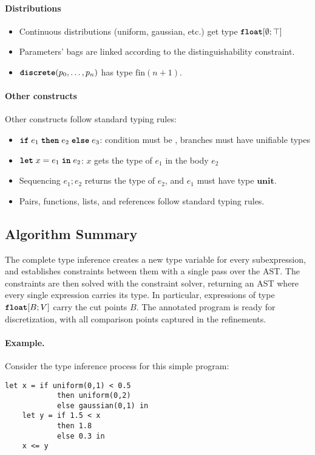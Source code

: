 \paragraph{Distributions}
\begin{itemize}
    \item Continuous distributions (uniform, gaussian, etc.) get type $\textnormal{\ttfamily\bfseries float}[\emptyset; \top]$
    \item Parameters' bags are linked according to the distinguishability constraint.
    \item $\textnormal{\ttfamily\bfseries discrete}(p_0, \ldots, p_n)$ has type $\text{fin}(n+1)$.
\end{itemize}


\paragraph{Other constructs}
Other constructs follow standard typing rules:
\begin{itemize}
    \item $\textnormal{\ttfamily\bfseries if} \; e_1\; \textnormal{\ttfamily\bfseries then} \; e_2\; \textnormal{\ttfamily\bfseries else} \; e_3$: condition must be \bool{}, branches must have unifiable types
    \item $\textnormal{\ttfamily\bfseries let} \; x = e_1 \; \textnormal{\ttfamily\bfseries in} \; e_2$: $x$ gets the type of $e_1$ in the body $e_2$
    \item Sequencing $e_1; e_2$ returns the type of $e_2$, and $e_1$ must have type $\textbf{unit}$.
    \item Pairs, functions, lists, and references follow standard typing rules.
\end{itemize}

\subsection{Algorithm Summary}

The complete type inference creates a new type variable for every subexpression, and establishes constraints between them with a single pass over the AST. The constraints are then solved with the constraint solver, returning an AST where every single expression carries its type. In particular, expressions of type $\textnormal{\ttfamily\bfseries float}[B; V]$ carry the cut points $B$. The annotated program is ready for discretization, with all comparison points captured in the refinements.

\paragraph{Example.}
Consider the type inference process for this simple program:
\begin{lstlisting}[aboveskip=1em,belowskip=1em,escapechar=!]
    let x = if uniform(0,1) < 0.5 
            then uniform(0,2) 
            else gaussian(0,1) in
    let y = if 1.5 < x
            then 1.8
            else 0.3 in
    x <= y
\end{lstlisting}

